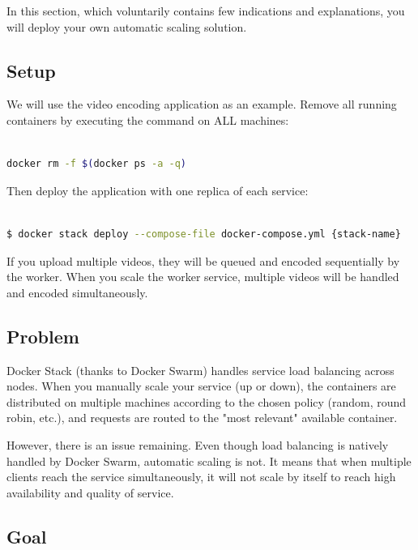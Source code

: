 \documentclass[a4paper,11pt]{exam}
\begin{document}
In this section, which voluntarily contains few indications and explanations, you will deploy your own automatic scaling solution.

\subsection{Setup}

We will use the video encoding application as an example.
Remove all running containers by executing the command on ALL machines:

\begin{lstlisting}[frame=single,language={sh}]  % Start your code-block

docker rm -f $(docker ps -a -q)

\end{lstlisting}

Then deploy the application with one replica of each service:

\begin{lstlisting}[frame=single,language={sh}]  % Start your code-block

$ docker stack deploy --compose-file docker-compose.yml {stack-name}

\end{lstlisting}

If you upload multiple videos, they will be queued and encoded sequentially by the worker.
When you scale the worker service, multiple videos will be handled and encoded simultaneously.

\subsection{Problem}

Docker Stack (thanks to Docker Swarm) handles service load balancing across nodes.
When you manually scale your service (up or down), the containers are distributed on multiple machines according to the chosen policy (random, round robin, etc.), and requests are routed to the "most relevant" available container.

However, there is an issue remaining.
Even though load balancing is natively handled by Docker Swarm, automatic scaling is not.
It means that when multiple clients reach the service simultaneously, it will not scale by itself to reach high availability and quality of service.

\subsection{Goal}
\end{document}
